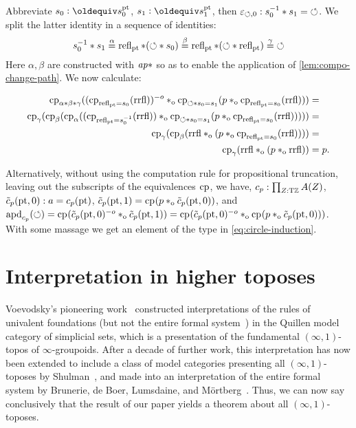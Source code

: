 \documentclass[a4paper,12pt]{amsart}
\begin{document}
Abbreviate $s_0 \defeq s^\pt_0$, $s_1 \defeq s^\pt_1$,
then $\varepsilon_{{\circlearrowleft},0} : s_0^{-1} * s_1 = {{\circlearrowleft}}$.
We split the latter identity in a sequence of identities:
\[
s_0^{-1} * s_1 \stackrel{\alpha}{=}
\mathop{{\mathrm{refl}}_{{\mathord{\mathrm{pt}}}}}*({\circlearrowleft}* s_0) \stackrel{\beta}{=}
\mathop{{\mathrm{refl}}_{{\mathord{\mathrm{pt}}}}}*({\circlearrowleft}*\mathop{{\mathrm{refl}}_{{\mathord{\mathrm{pt}}}}})\stackrel{\gamma}{=} {{\circlearrowleft}}
\]
Here $\alpha,\beta$ are constructed with $\mathop{{\it ap}{*}}$ so as to
enable the application of \cref{lem:compo-change-path}.
We now calculate:

\begin{align*}
\mathrm{cp}_{\alpha*\beta*\gamma}
((\mathrm{cp}_{\mathop{{\mathrm{refl}}_{{\mathord{\mathrm{pt}}}}} = s_0}(\mathrm{rrfl}))^{-o} *_{\mathrm{o}}
   \mathrm{cp}_{{\circlearrowleft}* s_0 = s_1}(p*_{\mathrm{o}}\mathrm{cp}_{\mathop{{\mathrm{refl}}_{{\mathord{\mathrm{pt}}}}} = s_0}(\mathrm{rrfl})))&= \\
\mathrm{cp}_{\gamma}(\mathrm{cp}_{\beta}(\mathrm{cp}_{\alpha}
((\mathrm{cp}_{\mathop{{\mathrm{refl}}_{{\mathord{\mathrm{pt}}}}} = s_0^{-1}}(\mathrm{rrfl})) *_{\mathrm{o}}
   \mathrm{cp}_{{\circlearrowleft}* s_0 = s_1}(p*_{\mathrm{o}}\mathrm{cp}_{\mathop{{\mathrm{refl}}_{{\mathord{\mathrm{pt}}}}} = s_0}(\mathrm{rrfl})))))&= \\
\mathrm{cp}_{\gamma}(\mathrm{cp}_{\beta}
(\mathrm{rrfl} *_{\mathrm{o}}
   (p*_{\mathrm{o}}\mathrm{cp}_{\mathop{{\mathrm{refl}}_{{\mathord{\mathrm{pt}}}}} = s_0}(\mathrm{rrfl}))))&= \\
\mathrm{cp}_{\gamma}(\mathrm{rrfl}*_{\mathrm{o}}(p*_{\mathrm{o}}\mathrm{rrfl}))&= p.
\end{align*}

Alternatively, without using the computation rule for propositional truncation,
leaving out the subscripts of the equivalences $\mathrm{cp}_{}$, we have,
$c_p : \prod_{Z:{\mathrm{T}\mathbb{Z}}}A(Z)$,
$\tilde c_p({\mathord{\mathrm{pt}}},0) : a = c_p({\mathord{\mathrm{pt}}})$,
$\tilde c_p({\mathord{\mathrm{pt}}},1) = \mathrm{cp}_{}(p *_{\mathrm{o}} \tilde c_p({\mathord{\mathrm{pt}}},0))$, and
$\mathop{{\mathrm{apd}}_{c_p}}({\circlearrowleft}) = \mathrm{cp}_{}(\tilde c_p({\mathord{\mathrm{pt}}},0)^{-o}*_{\mathrm{o}} \tilde c_p({\mathord{\mathrm{pt}}},1))
= \mathrm{cp}_{}(\tilde c_p({\mathord{\mathrm{pt}}},0)^{-o}*_{\mathrm{o}} \mathrm{cp}_{}(p *_{\mathrm{o}} \tilde c_p({\mathord{\mathrm{pt}}},0)))$.
With some massage we get an element of the type in \cref{eq:circle-induction}.

\section{Interpretation in higher toposes}
\label{sec:topos}

Voevodsky's pioneering work~\cite{1211.2851} constructed interpretations of the rules of univalent foundations (but not the entire formal system~\cite{voevodsky:not-interp}) in the Quillen model category of simplicial sets, which is a presentation of the fundamental $(\infty,1)$-topos of $\infty$-groupoids.
After a decade of further work, this interpretation has now been extended to include a class of model categories presenting all $(\infty,1)$-toposes by Shulman~\cite{shulman:univinj}, and made into an interpretation of the entire formal system by Brunerie, de Boer, Lumsdaine, and M\"{o}rtberg~\cite{initiality}.
Thus, we can now say conclusively that the result of our paper yields a theorem about all $(\infty,1)$-toposes.
\end{document}

